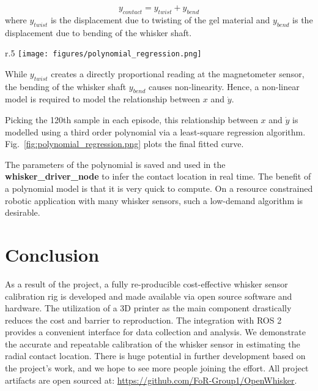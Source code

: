 \documentclass[runningheads]{llncs}
\begin{document}
\begin{equation}
y_{contact} = y_{twist} + y_{bend}
\end{equation}
where \(y_{twist}\) is the displacement due to twisting of the gel material and \(y_{bend}\) is the displacement due to bending of the whisker shaft.

\begin{wrapfigure}{r}{.5\textwidth}
    \centering
    \texttt{[image: figures/polynomial\_regression.png]}
    \caption{Polynomial Regression of the relationship 100th sample of \(\dot{y}\) in each episode and the contact distance \(x\)}
    \label{fig:polynomial_regression.png}
\end{wrapfigure}

While \(y_{twist}\) creates a directly proportional reading at the magnetometer sensor, the bending of the whisker shaft \(y_{bend}\) causes non-linearity. Hence, a non-linear model is required to model the relationship between \(x\) and \(\dot{y}\).

Picking the 120th sample in each episode, this relationship between \(x\) and \(\dot{y}\) is modelled using a third order polynomial via a least-square regression algorithm. Fig.~\ref*{fig:polynomial_regression.png} plots the final fitted curve.

The parameters of the polynomial is saved and used in the \textbf{whisker\_driver\_node} to infer the contact location in real time. The benefit of a polynomial model is that it is very quick to compute. On a resource constrained robotic application with many whisker sensors, such a low-demand algorithm is desirable.

\section{Conclusion}

As a result of the project, a fully re-producible cost-effective whisker sensor calibration rig is developed and made available via open source software and hardware. The utilization of a 3D printer as the main component drastically reduces the cost and barrier to reproduction. The integration with ROS 2 provides a convenient interface for data collection and analysis. We demonstrate the accurate and repeatable calibration of the whisker sensor in estimating the radial contact location. There is huge potential in further development based on the project's work, and we hope to see more people joining the effort. All project artifacts are open sourced at: \url{https://github.com/FoR-Group1/OpenWhisker}.


\end{document}
